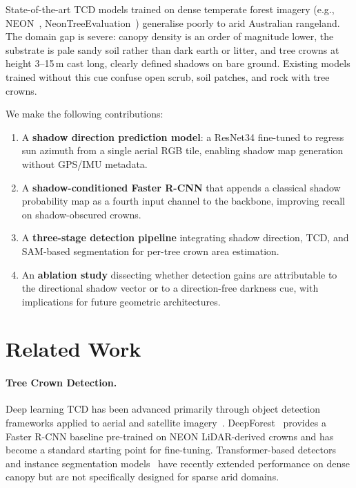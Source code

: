 \documentclass[10pt,twocolumn]{article}
\begin{document}
State-of-the-art TCD models trained on dense temperate forest imagery (e.g.,
NEON~\cite{weinstein2020neon}, NeonTreeEvaluation~\cite{weinstein2021benchmark})
generalise poorly to arid Australian rangeland. The domain gap is severe:
canopy density is an order of magnitude lower, the substrate is pale sandy soil
rather than dark earth or litter, and tree crowns at height 3--15\,m cast
long, clearly defined shadows on bare ground. Existing models trained without
this cue confuse open scrub, soil patches, and rock with tree crowns.

We make the following contributions:
\begin{enumerate}
  \item A \textbf{shadow direction prediction model}: a ResNet34 fine-tuned to
        regress sun azimuth from a single aerial RGB tile, enabling shadow map
        generation without GPS/IMU metadata.
  \item A \textbf{shadow-conditioned Faster R-CNN} that appends a classical
        shadow probability map as a fourth input channel to the backbone,
        improving recall on shadow-obscured crowns.
  \item A \textbf{three-stage detection pipeline} integrating shadow direction,
        TCD, and SAM-based segmentation for per-tree crown area estimation.
  \item An \textbf{ablation study} dissecting whether detection gains are
        attributable to the directional shadow vector or to a direction-free
        darkness cue, with implications for future geometric architectures.
\end{enumerate}

\section{Related Work}

\paragraph{Tree Crown Detection.}
Deep learning TCD has been advanced primarily through object detection frameworks
applied to aerial and satellite imagery~\cite{weinstein2020neon,li2023single}.
DeepForest~\cite{weinstein2020neon} provides a Faster R-CNN baseline pre-trained
on NEON LiDAR-derived crowns and has become a standard starting point for
fine-tuning. Transformer-based detectors~\cite{li2023single} and instance
segmentation models~\cite{kirillov2023sam} have recently extended performance
on dense canopy but are not specifically designed for sparse arid domains.
\end{document}
